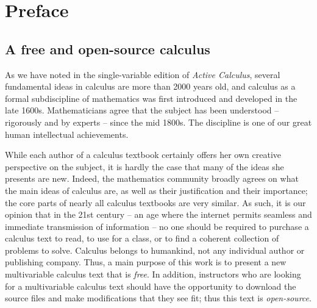 \chapter{Preface} 

\section*{A free and open-source calculus \ } 

\vspace*{-0.15in}

As we have noted in the single-variable edition of \emph{Active Calculus}, several fundamental ideas in calculus are more than 2000 years old, and calculus as a formal subdiscipline of mathematics was first introduced and developed in the late 1600s.  Mathematicians agree that the subject has been understood -- rigorously and by experts -- since the mid 1800s.  The discipline is one of our great human intellectual achievements.

While each author of a calculus textbook certainly offers her own creative perspective on the subject, it is hardly the case that many of the ideas she presents are new.  Indeed, the mathematics community broadly agrees on what the main ideas of calculus are, as well as their justification and their importance; the core parts of nearly all calculus textbooks are very similar.  As such, it is our opinion that in the 21st century -- an age where the internet permits seamless and immediate transmission of information -- no one should be required to purchase a calculus text to read, to use for a class, or to find a coherent collection of problems to solve.  Calculus belongs to humankind, not any individual author or publishing company.  Thus, a main purpose of this work is to present a new multivariable calculus text that is \emph{free}.  In addition, instructors who are looking for a multivariable calculus text should have the opportunity to download the source files and make modifications that they see fit; thus this text is \emph{open-source}.  %

